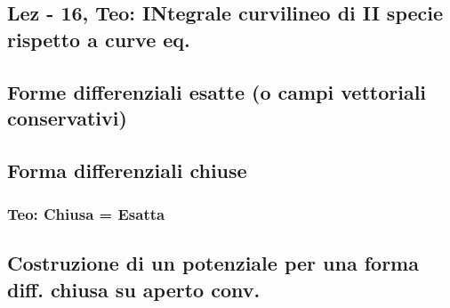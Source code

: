 \subsection{Lez - 16, Teo: INtegrale curvilineo di II specie rispetto a curve eq.}
\subsection{Forme differenziali esatte (o campi vettoriali conservativi)}
\subsection{Forma differenziali chiuse}
\subsubsection{Teo: Chiusa = Esatta}
\subsection{Costruzione di un potenziale per una forma diff. chiusa su aperto conv.}
